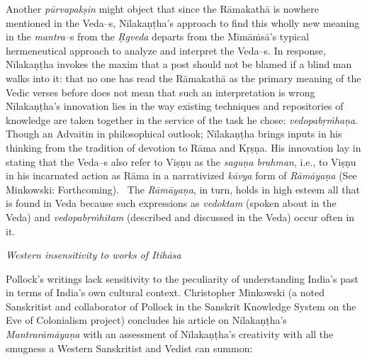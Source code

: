 Another \textit{pūrvapakṣin }might object that since the Rāmakathā is nowhere mentioned in the Veda–s, Nīlakaṇṭha’s approach to find this wholly new meaning in the \textit{mantra}–s from the \textit{Ṛgveda} departs from the Mīmāṁsā’s typical hermeneutical approach to analyze and interpret the Veda–s. In response, Nīlakaṇṭha invokes the maxim that a post should not be blamed if a blind man walks into it: that no one has read the Rāmakathā as the primary meaning of the Vedic verses before does not mean that such an interpretation is wrong Nīlakaṇṭha's innovation lies in the way existing techniques and repositories of knowledge are taken together in the service of the task he chose: \textit{vedopabṛṁhaṇa}. Though an Advaitin in philosophical outlook; Nīlakaṇṭha brings inputs in his thinking from the tradition of devotion to Rāma and Kṛṣṇa. His innovation lay in stating that the Veda–s also refer to Viṣṇu as the \textit{saguṇa brahman}, i.e., to Viṣṇu in his incarnated action as Rāma in a narrativized \textit{kāvya} form of \textit{Rāmāyaṇa} (See Minkowski: Forthcoming).  The \textit{Rāmāyaṇa}, in turn, holds in high esteem all that is found in Veda because such expressions as \textit{vedoktam} (spoken about in the Veda) and \textit{vedopabṛṁhitam} (described and discussed in the Veda) occur often in it.

\textit{Western insensitivity to works of Itihāsa}

Pollock’s writings lack sensitivity to the peculiarity of understanding India’s past in terms of India’s own cultural context. Christopher Minkowski (a noted Sanskritist and collaborator of Pollock in the Sanskrit Knowledge System on the Eve of Colonialism project) concludes his article on Nīlakaṇṭha’s \textit{Mantrarāmāyaṇa} with an assessment of Nīlakaṇṭha’s creativity with all the smugness a Western Sanskritist and Vedist can summon:

